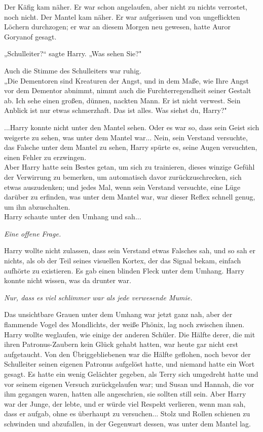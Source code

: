 {Der Käfig kam näher. Er war schon angelaufen, aber nicht zu nichts verrostet, noch nicht. Der Mantel kam näher. Er war aufgerissen und von ungeflickten Löchern durchzogen; er war an diesem Morgen neu gewesen, hatte Auror Goryanof gesagt.

„Schulleiter?“ sagte Harry. „Was sehen Sie?"

Auch die Stimme des Schulleiters war ruhig.\\ „Die Dementoren sind Kreaturen der Angst, und in dem Maße, wie Ihre Angst vor dem Dementor abnimmt, nimmt auch die Furchterregendheit seiner Gestalt ab. Ich sehe einen großen, dünnen, nackten Mann. Er ist nicht verwest. Sein Anblick ist nur etwas schmerzhaft. Das ist alles. Was siehst du, Harry?"

...Harry konnte nicht unter den Mantel sehen. Oder es war so, dass sein Geist sich weigerte zu sehen, was unter dem Mantel war... Nein, sein Verstand versuchte, das Falsche unter dem Mantel zu sehen, Harry spürte es, seine Augen versuchten, einen Fehler zu erzwingen.\\ Aber Harry hatte sein Bestes getan, um sich zu trainieren, dieses winzige Gefühl der Verwirrung zu bemerken, um automatisch davor zurückzuschrecken, sich etwas auszudenken; und jedes Mal, wenn sein Verstand versuchte, eine Lüge darüber zu erfinden, was unter dem Mantel war, war dieser Reflex schnell genug, um ihn abzuschalten.\\ Harry schaute unter den Umhang und sah...

\emph{Eine offene Frage.}

Harry wollte nicht zulassen, dass sein Verstand etwas Falsches sah, und so sah er nichts, als ob der Teil seines visuellen Kortex, der das Signal bekam, einfach aufhörte zu existieren. Es gab einen blinden Fleck unter dem Umhang. Harry konnte nicht wissen, was da drunter war.

\emph{Nur, dass es viel schlimmer war als jede verwesende Mumie.}

Das unsichtbare Grauen unter dem Umhang war jetzt ganz nah, aber der flammende Vogel des Mondlichts, der weiße Phönix, lag noch zwischen ihnen.\\ Harry wollte weglaufen, wie einige der anderen Schüler. Die Hälfte derer, die mit ihren Patronus-Zaubern kein Glück gehabt hatten, war heute gar nicht erst aufgetaucht. Von den Übriggebliebenen war die Hälfte geflohen, noch bevor der Schulleiter seinen eigenen Patronus aufgelöst hatte, und niemand hatte ein Wort gesagt. Es hatte ein wenig Gelächter gegeben, als Terry sich umgedreht hatte und vor seinem eigenen Versuch zurückgelaufen war; und Susan und Hannah, die vor ihm gegangen waren, hatten alle angeschrien, sie sollten still sein. Aber Harry war der Junge, der lebte, und er würde viel Respekt verlieren, wenn man sah, dass er aufgab, ohne es überhaupt zu versuchen... Stolz und Rollen schienen zu schwinden und abzufallen, in der Gegenwart dessen, was unter dem Mantel lag.

}
